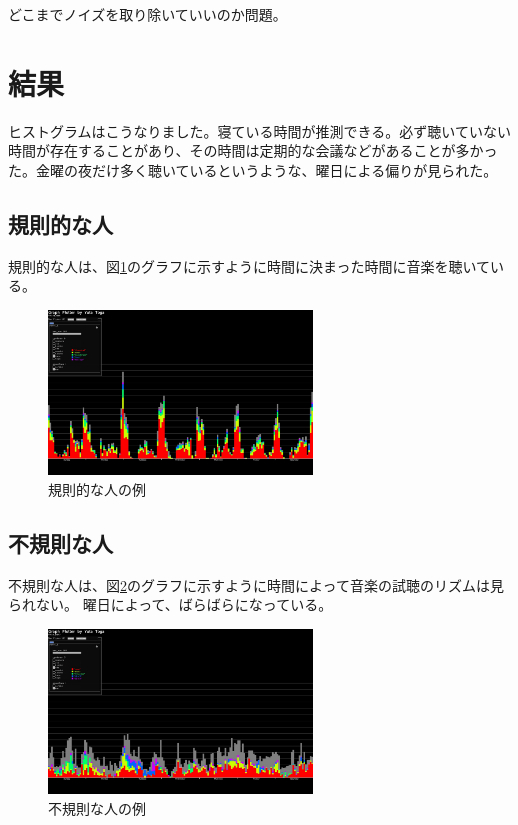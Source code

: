 \documentclass[11pt, twocolumn]{jsarticle}
\begin{document}
	
どこまでノイズを取り除いていいのか問題。



\section{結果}


ヒストグラムはこうなりました。寝ている時間が推測できる。必ず聴いていない時間が存在することがあり、その時間は定期的な会議などがあることが多かった。金曜の夜だけ多く聴いているというような、曜日による偏りが見られた。
\subsection{規則的な人}
規則的な人は、図\ref{sample_regular}のグラフに示すように時間に決まった時間に音楽を聴いている。
\begin{figure}[h]
\begin{center}
\includegraphics[width=7cm]{sample_regular.jpg}
\caption{規則的な人の例}
\label{sample_regular}
\end{center}
\end{figure}


\subsection{不規則な人}
不規則な人は、図\ref{sample_irregular}のグラフに示すように時間によって音楽の試聴のリズムは見られない。
曜日によって、ばらばらになっている。

\begin{figure}[h]
\begin{center}
\includegraphics[width=7cm]{sample_irregular.jpg}
\caption{不規則な人の例}
\label{sample_irregular}
\end{center}
\end{figure}
\end{document}
